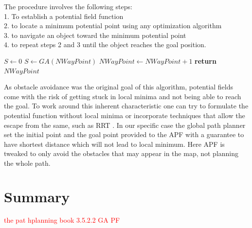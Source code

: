 The procedure involves the following steps:\\
1. To establish a potential field function\\
2. to locate a minimum potential point using any optimization algorithm\\
3. to navigate an object toward the minimum potential point\\
4. to repeat steps 2 and 3 until the object reaches the goal position.\\


\begin{algorithm}
\caption{}\label{alg:euclid222}
\begin{algorithmic}[1]
 \State $S\gets 0$
	 \State $S \gets GA(NWayPoint)$
	  \State $NWayPoint\gets NWayPoint+1$
  \EndWhile\label{endwhile}
\State \textbf{return} $NWayPoint$
\EndProcedure
\end{algorithmic}
\end{algorithm}


As obstacle avoidance was the original goal of this algorithm, potential fields come with the risk of getting stuck in local minima and not being able to reach the goal. To work around this inherent characteristic one can try to formulate the potential function without local minima or incorporate techniques that allow the escape from the same, such as RRT \cite{latombe2012robot,planningBook}. In our specific case the global path planner set the initial point and the goal point provided to the APF with a guarantee to have shortest distance which will not lead to local minimum. Here APF is tweaked to only avoid the obstacles that may appear in the map, not planning the whole path.

\section{Summary}

\textcolor{red}{ the pat hplanning book 3.5.2.2 GA PF}